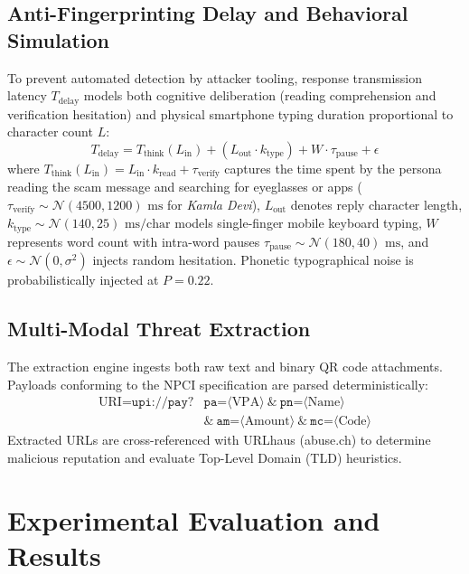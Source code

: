 \documentclass[conference]{IEEEtran}
\begin{document}
\subsection{Anti-Fingerprinting Delay and Behavioral Simulation}
To prevent automated detection by attacker tooling, response transmission latency $T_{\text{delay}}$ models both cognitive deliberation (reading comprehension and verification hesitation) and physical smartphone typing duration proportional to character count $L$:
\begin{equation}
T_{\text{delay}} = T_{\text{think}}(L_{\text{in}}) + (L_{\text{out}} \cdot k_{\text{type}}) + W \cdot \tau_{\text{pause}} + \epsilon
\end{equation}
where $T_{\text{think}}(L_{\text{in}}) = L_{\text{in}} \cdot k_{\text{read}} + \tau_{\text{verify}}$ captures the time spent by the persona reading the scam message and searching for eyeglasses or apps ($\tau_{\text{verify}} \sim \mathcal{N}(4500, 1200)\text{ ms}$ for \textit{Kamla Devi}), $L_{\text{out}}$ denotes reply character length, $k_{\text{type}} \sim \mathcal{N}(140, 25)\text{ ms/char}$ models single-finger mobile keyboard typing, $W$ represents word count with intra-word pauses $\tau_{\text{pause}} \sim \mathcal{N}(180, 40)\text{ ms}$, and $\epsilon \sim \mathcal{N}(0, \sigma^2)$ injects random hesitation. Phonetic typographical noise is probabilistically injected at $P = 0.22$.

\subsection{Multi-Modal Threat Extraction}
The extraction engine ingests both raw text and binary QR code attachments. Payloads conforming to the NPCI specification are parsed deterministically:
\begin{equation}
\begin{aligned}
\text{URI} = \texttt{upi://pay?} & \texttt{pa=}\langle\text{VPA}\rangle \ \texttt{\&} \ \texttt{pn=}\langle\text{Name}\rangle \\
& \texttt{\&} \ \texttt{am=}\langle\text{Amount}\rangle \ \texttt{\&} \ \texttt{mc=}\langle\text{Code}\rangle
\end{aligned}
\end{equation}
Extracted URLs are cross-referenced with URLhaus (abuse.ch) to determine malicious reputation and evaluate Top-Level Domain (TLD) heuristics.

\section{Experimental Evaluation and Results}
\end{document}
